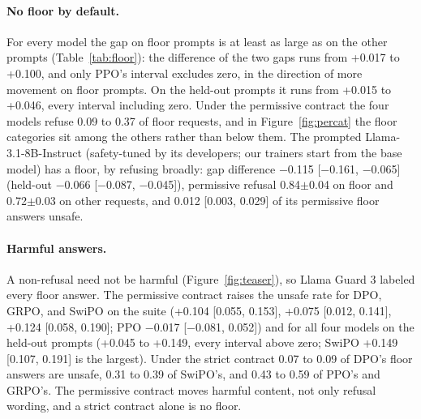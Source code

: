 \documentclass[letterpaper]{article} %
\begin{document}
\paragraph{No floor by default.} For every model the gap on floor prompts is at least as large as on the other prompts (Table~\ref{tab:floor}): the difference of the two gaps runs from +0.017 to +0.100, and only PPO's interval excludes zero, in the direction of more movement on floor prompts. On the held-out prompts it runs from +0.015 to +0.046, every interval including zero. Under the permissive contract the four models refuse 0.09 to 0.37 of floor requests, and in Figure~\ref{fig:percat} the floor categories sit among the others rather than below them.
The prompted Llama-3.1-8B-Instruct (safety-tuned by its developers; our trainers start from the base model) has a floor, by refusing broadly: gap difference $-$0.115 [$-$0.161, $-$0.065] (held-out $-$0.066 [$-$0.087, $-$0.045]), permissive refusal 0.84$\pm$0.04 on floor and 0.72$\pm$0.03 on other requests, and 0.012 [0.003, 0.029] of its permissive floor answers unsafe.

\paragraph{Harmful answers.} A non-refusal need not be harmful (Figure~\ref{fig:teaser}), so Llama Guard 3 labeled every floor answer. The permissive contract raises the unsafe rate for DPO, GRPO, and SwiPO on the suite (+0.104 [0.055, 0.153], +0.075 [0.012, 0.141], +0.124 [0.058, 0.190]; PPO $-$0.017 [$-$0.081, 0.052]) and for all four models on the held-out prompts (+0.045 to +0.149, every interval above zero; SwiPO +0.149 [0.107, 0.191] is the largest). Under the strict contract 0.07 to 0.09 of DPO's floor answers are unsafe, 0.31 to 0.39 of SwiPO's, and 0.43 to 0.59 of PPO's and GRPO's. The permissive contract moves harmful content, not only refusal wording, and a strict contract alone is no floor.
\end{document}
